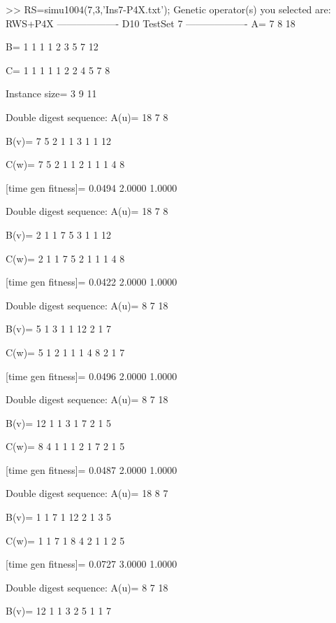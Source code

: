 >> RS=simu1004(7,3,'Ins7-P4X.txt');
Genetic operator(s) you selected are:
RWS+P4X
------------------- D10 TestSet 7 -------------------
A=
     7     8    18

B=
     1     1     1     1     2     3     5     7    12

C=
     1     1     1     1     1     2     2     4     5     7     8

Instance size=
     3     9    11

Double digest sequence:
A(u)=
    18     7     8

B(v)=
     7     5     2     1     1     3     1     1    12

C(w)=
     7     5     2     1     1     2     1     1     1     4     8

[time gen fitness]=
    0.0494    2.0000    1.0000

Double digest sequence:
A(u)=
    18     7     8

B(v)=
     2     1     1     7     5     3     1     1    12

C(w)=
     2     1     1     7     5     2     1     1     1     4     8

[time gen fitness]=
    0.0422    2.0000    1.0000

Double digest sequence:
A(u)=
     8     7    18

B(v)=
     5     1     3     1     1    12     2     1     7

C(w)=
     5     1     2     1     1     1     4     8     2     1     7

[time gen fitness]=
    0.0496    2.0000    1.0000

Double digest sequence:
A(u)=
     8     7    18

B(v)=
    12     1     1     3     1     7     2     1     5

C(w)=
     8     4     1     1     1     2     1     7     2     1     5

[time gen fitness]=
    0.0487    2.0000    1.0000

Double digest sequence:
A(u)=
    18     8     7

B(v)=
     1     1     7     1    12     2     1     3     5

C(w)=
     1     1     7     1     8     4     2     1     1     2     5

[time gen fitness]=
    0.0727    3.0000    1.0000

Double digest sequence:
A(u)=
     8     7    18

B(v)=
    12     1     1     3     2     5     1     1     7

